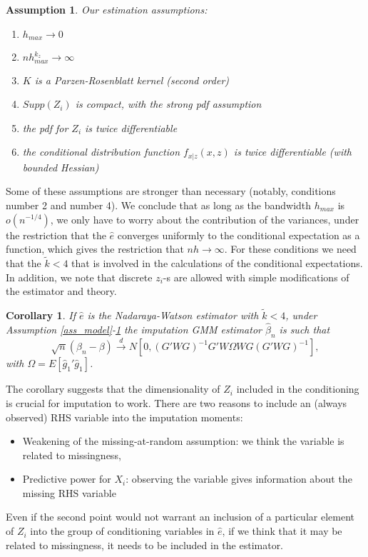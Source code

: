 \documentclass{article}
\newtheorem{assumption}{Assumption}
\newtheorem{corollary}{Corollary}
\theoremstyle{definition}
\theoremstyle{remark}
\begin{document}
\begin{assumption}\label{ass_estimation}
    Our estimation assumptions:
    \begin{enumerate}
        \item $h_{max}\rightarrow 0$
        \item $nh_{max}^{k_z}\rightarrow \infty$
        \item $K$ is a Parzen-Rosenblatt kernel (second order)
        \item $Supp(Z_i)$ is compact, with the strong pdf assumption
        \item the pdf for $Z_i$ is twice differentiable
        \item the conditional distribution function $f_{x|z}(x,z)$ is twice differentiable (with bounded Hessian)
    \end{enumerate}
\end{assumption}
Some of these assumptions are stronger than necessary (notably, conditions number 2 and number 4). We conclude that as long as the bandwidth $h_{max}$ is $o(n^{-1/4})$, we only have to worry about the contribution of the variances, under the restriction that the $\hat{e}$ converges uniformly to the conditional expectation as a function, which gives the restriction that $nh \rightarrow \infty$. For these conditions we need that the $\tilde{k}<4$ that is involved in the calculations of the conditional expectations. In addition, we note that discrete $z_i$-s are allowed with simple modifications of the estimator and theory.
\begin{corollary}\label{cor_NWTheory}
	If $\hat{e}$ is the Nadaraya-Watson estimator with $\tilde{k}<4$, under Assumption \ref{ass_model}-\ref{ass_estimation} the imputation GMM estimator $\hat{\beta}_n$ is such that
		\[\sqrt{n}(\beta_n-\beta) \stackrel{d}{\rightarrow} N[0, (G'WG)^{-1}G'W \Omega W G (G'WG)^{-1}],
	\]
	with $\Omega= E[\hat{g}_1'\hat{g}_1]$. 
\end{corollary}
The corollary suggests that the dimensionality of $Z_i$ included in the conditioning is crucial for imputation to work. There are two reasons to include an (always observed) RHS variable into the imputation moments:
\begin{itemize}
	\item Weakening of the missing-at-random assumption: we think the variable is related to missingness,
	\item Predictive power for $X_i$: observing the variable gives information about the missing RHS variable
\end{itemize}
Even if the second point would not warrant an inclusion of a particular element of $Z_i$ into the group of conditioning variables in $\hat{e}$, if we think that it may be related to missingness, it needs to be included in the estimator.
\end{document}
